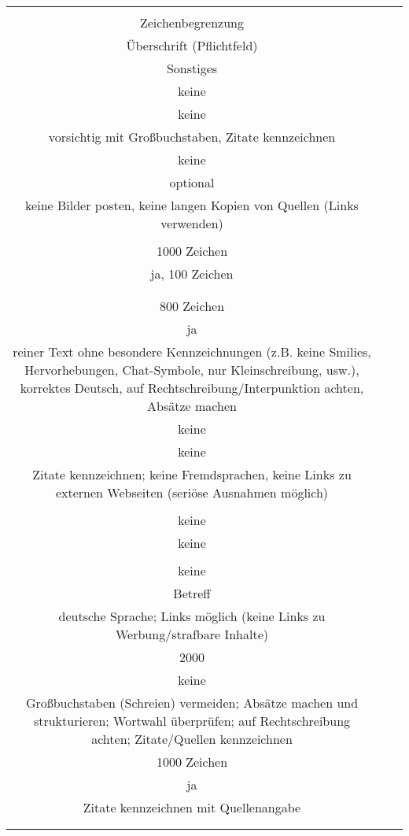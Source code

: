 \begin{landscape}
\begin{tabular}{ccc}
{		
Kommentar: formale Regeln\\
Zeichenbegrenzung\\
Überschrift (Pflichtfeld)\\
Sonstiges 
&		%
		\\
		keine\\
		keine\\
		vorsichtig mit Großbuchstaben, Zitate kennzeichnen	
		&
		\\
		keine\\
		optional\\
		keine Bilder posten, keine langen Kopien von Quellen (Links verwenden)\\
		&
		\\
		1000 Zeichen\\
		ja, 100 Zeichen\\
		\\
		&
		\\
		800 Zeichen\\
		ja\\
		reiner Text ohne besondere Kennzeichnungen (z.B. keine Smilies, Hervorhebungen, Chat-Symbole, nur Kleinschreibung, usw.), korrektes Deutsch, auf Rechtschreibung/Interpunktion achten, Absätze machen
		&
		\\
		keine\\
		keine\\
		Zitate kennzeichnen; keine Fremdsprachen, keine Links zu externen Webseiten (seriöse Ausnahmen möglich)\\
		&
		\\
		keine\\
		keine\\
		&
		\\
		keine\\
		Betreff\\
		deutsche Sprache; Links möglich (keine Links zu Werbung/strafbare Inhalte)
		&
		\\
		2000\\
		keine\\
		Großbuchstaben (Schreien) vermeiden; Absätze machen und strukturieren; Wortwahl überprüfen; auf Rechtschreibung achten; 				Zitate/Quellen kennzeichnen
		&
		\\
		1000 Zeichen\\
		ja\\
		Zitate kennzeichnen mit Quellenangabe\\
		&
		\\
}
\end{tabular}
\end{landscape}
